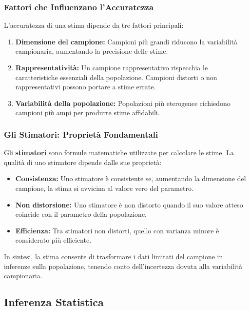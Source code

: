 \documentclass[
  letterpaper,
]{krantz}
\providecommand{\tightlist}{%
  \setlength{\itemsep}{0pt}\setlength{\parskip}{0pt}}\usepackage{longtable,booktabs,array}
\begin{document}
\subsubsection{Fattori che Influenzano
l'Accuratezza}\label{fattori-che-influenzano-laccuratezza}

L'accuratezza di una stima dipende da tre fattori principali:

\begin{enumerate}
\def\labelenumi{\arabic{enumi}.}
\tightlist
\item
  \textbf{Dimensione del campione:} Campioni più grandi riducono la
  variabilità campionaria, aumentando la precisione delle stime.
\item
  \textbf{Rappresentatività:} Un campione rappresentativo rispecchia le
  caratteristiche essenziali della popolazione. Campioni distorti o non
  rappresentativi possono portare a stime errate.
\item
  \textbf{Variabilità della popolazione:} Popolazioni più eterogenee
  richiedono campioni più ampi per produrre stime affidabili.
\end{enumerate}

\subsubsection{Gli Stimatori: Proprietà
Fondamentali}\label{gli-stimatori-proprietuxe0-fondamentali}

Gli \textbf{stimatori} sono formule matematiche utilizzate per calcolare
le stime. La qualità di uno stimatore dipende dalle sue proprietà:

\begin{itemize}
\tightlist
\item
  \textbf{Consistenza:} Uno stimatore è consistente se, aumentando la
  dimensione del campione, la stima si avvicina al valore vero del
  parametro.
\item
  \textbf{Non distorsione:} Uno stimatore è non distorto quando il suo
  valore atteso coincide con il parametro della popolazione.
\item
  \textbf{Efficienza:} Tra stimatori non distorti, quello con varianza
  minore è considerato più efficiente.
\end{itemize}

In sintesi, la stima consente di trasformare i dati limitati del
campione in inferenze sulla popolazione, tenendo conto dell'incertezza
dovuta alla variabilità campionaria.

\subsection{Inferenza Statistica}\label{inferenza-statistica}
\end{document}
